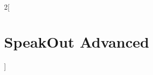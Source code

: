 \documentclass[10pt,a4paper]{article}
\begin{document}

\begin{multicols}{2}[\section{SpeakOut Advanced}]

\end{multicols}










\end{document}
